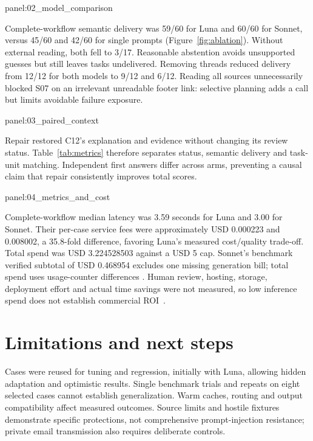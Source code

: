 \documentclass[11pt,a4paper]{article}
\newcommand{\reportsection}[2]{\section*{#1}\label{#2}\addcontentsline{toc}{section}{#1}}
\newcommand{\reportfigure}[3]{\par\medskip\noindent\begin{minipage}{\linewidth}\captionsetup{type=figure}\centering\csname panel:#1\endcsname\caption{#2}\label{#3}\end{minipage}\par\medskip}
\newcommand{\reporttable}[3]{\par\medskip\noindent\begin{minipage}{\linewidth}\captionsetup{type=table}\centering\caption{#2}\label{#3}\smallskip\csname panel:#1\endcsname\end{minipage}\par\medskip}
\begin{document}
\reportfigure{02_model_comparison}{Six-model comparison, 60 cases per model. Strict: exact status; permitted: pre-approved status/count. Lines join median and 95th-percentile times, not confidence intervals. Panel c shows generation-verified service-fee subtotals.}{fig:benchmark}

Complete-workflow semantic delivery was 59/60 for Luna and 60/60 for Sonnet, versus 45/60 and 42/60 for single prompts (Figure~\ref{fig:ablation}). Without external reading, both fell to 3/17. Reasonable abstention avoids unsupported guesses but still leaves tasks undelivered. Removing threads reduced delivery from 12/12 for both models to 9/12 and 6/12. Reading all sources unnecessarily blocked S07 on an irrelevant unreadable footer link: selective planning adds a call but limits avoidable failure exposure.

\reportfigure{03_paired_context}{Semantic delivery on identical case subsets. Bar-end labels show passes/cases; n denotes paired emails.}{fig:ablation}

Repair restored C12's explanation and evidence without changing its review status. Table~\ref{tab:metrics} therefore separates status, semantic delivery and task-unit matching. Independent first answers differ across arms, preventing a causal claim that repair consistently improves total scores.

\reporttable{04_metrics_and_cost}{Ablation quality, latency and service fees. Luna: GPT-6 Luna; Sonnet: Claude Sonnet 5.5. Strict and semantic columns count email passes; tasks are matched/expected obligation units. Fees cover each 60-case arm.}{tab:metrics}

Complete-workflow median latency was 3.59 seconds for Luna and 3.00 for Sonnet. Their per-case service fees were approximately USD 0.000223 and 0.008002, a 35.8-fold difference, favoring Luna's measured cost/quality trade-off. Total spend was USD 3.224528503 against a USD 5 cap. Sonnet's benchmark verified subtotal of USD 0.468954 excludes one missing generation bill; total spend uses usage-counter differences \cite{experiment}. Human review, hosting, storage, deployment effort and actual time savings were not measured, so low inference spend does not establish commercial ROI~\cite{costs}.

\reportsection{Limitations and next steps}{sec:limitations}
Cases were reused for tuning and regression, initially with Luna, allowing hidden adaptation and optimistic results. Single benchmark trials and repeats on eight selected cases cannot establish generalization. Warm caches, routing and output compatibility affect measured outcomes. Source limits and hostile fixtures demonstrate specific protections, not comprehensive prompt-injection resistance; private email transmission also requires deliberate controls.
\end{document}
